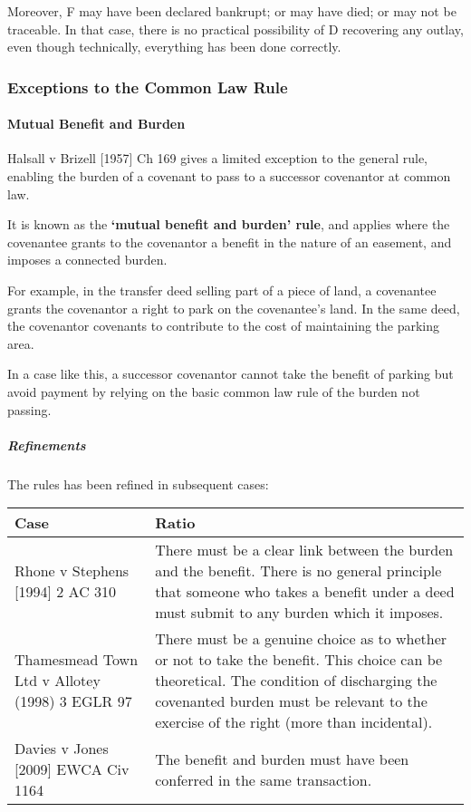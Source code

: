 \documentclass[
]{article}
\begin{document}
Moreover, F may have been declared bankrupt; or may have died; or may
not be traceable. In that case, there is no practical possibility of D
recovering any outlay, even though technically, everything has been done
correctly.

\hypertarget{exceptions-to-the-common-law-rule}{%
\subsubsection{Exceptions to the Common Law
Rule}\label{exceptions-to-the-common-law-rule}}

\hypertarget{mutual-benefit-and-burden}{%
\paragraph{Mutual Benefit and Burden}\label{mutual-benefit-and-burden}}

Halsall v Brizell {[}1957{]} Ch 169 gives a limited exception to the
general rule, enabling the burden of a covenant to pass to a successor
covenantor at common law.

It is known as the \textbf{`mutual benefit and burden' rule}, and
applies where the covenantee grants to the covenantor a benefit in the
nature of an easement, and imposes a connected burden.

For example, in the transfer deed selling part of a piece of land, a
covenantee grants the covenantor a right to park on the covenantee's
land. In the same deed, the covenantor covenants to contribute to the
cost of maintaining the parking area.

In a case like this, a successor covenantor cannot take the benefit of
parking but avoid payment by relying on the basic common law rule of the
burden not passing.

\hypertarget{refinements}{%
\subparagraph{Refinements}\label{refinements}}

The rules has been refined in subsequent cases:

\begin{longtable}[]{@{}ll@{}}
\toprule()
Case & Ratio \\
\midrule()
\endhead
Rhone v Stephens {[}1994{]} 2 AC 310 & There must be a clear link
between the burden and the benefit. There is no general principle that
someone who takes a benefit under a deed must submit to any burden which
it imposes. \\
Thamesmead Town Ltd v Allotey (1998) 3 EGLR 97 & There must be a genuine
choice as to whether or not to take the benefit. This choice can be
theoretical. The condition of discharging the covenanted burden must be
relevant to the exercise of the right (more than incidental). \\
Davies v Jones {[}2009{]} EWCA Civ 1164 & The benefit and burden must
have been conferred in the same transaction. \\
\bottomrule()
\end{longtable}
\end{document}
